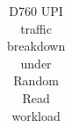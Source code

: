 \begin{table}[t]
\begin{tabular}{|l|cc|cc|cc||cc|cc|cc|}
\end{tabular}

\caption{D760 UPI traffic breakdown under Random Read workload}
\label{tab:upi-traffic}
\end{table}
